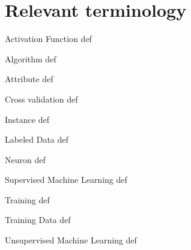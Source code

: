 \chapter*{Relevant terminology}

\begin{Description}
\item[Activation Function]
	def
\item[Algorithm]
	def
\item[Attribute]
	def
\item[Cross validation]
	def
\item[Instance]
	def
\item[Labeled Data]
	def
\item[Neuron]
	def
\item[Supervised Machine Learning]
	def
\item[Training]
	def
\item[Training Data]
	def
\item[Unsupervised Machine Learning]
	def

\end{Description}